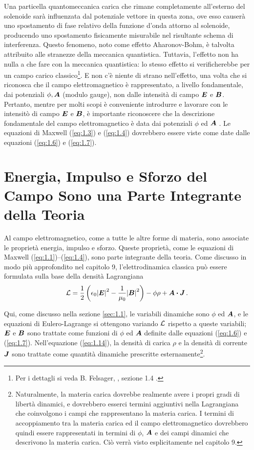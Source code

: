 Una particella quantomeccanica carica che rimane completamente all'esterno del solenoide sarà influenzata dal potenziale vettore in questa zona, ove esso causerà uno spostamento di fase relativo della funzione d'onda attorno al solenoide, producendo uno spostamento fisicamente misurabile nel risultante schema di interferenza. Questo fenomeno, noto come effetto Aharonov-Bohm, è talvolta attribuito alle stranezze della meccanica quantistica. Tuttavia, l'effetto non ha nulla a che fare con la meccanica quantistica: lo stesso effetto si verificherebbe per un campo carico classico\footnote{Per i dettagli si veda B. Felsager, , sezione 1.4 .}. 
E non c'è niente di strano nell'effetto, una volta che si riconosca che il campo elettromagnetico è rappresentato, a livello fondamentale, dai potenziali $\phi, \vb*{A}$ (modulo gauge), non dalle intensità di campo $\vb*{E}$ e $\vb*{B}$. Pertanto, mentre per molti scopi è conveniente introdurre e lavorare con le intensitò di campo $\vb*{E}$ e $\vb*{B}$, è importante riconoscere che la descrizione fondamentale del campo elettromagnetico è data dai potenziali $\phi$ ed $\vb*{A}$ . Le equazioni di Maxwell (\ref{eq:1.3}) e (\ref{eq:1.4}) dovrebbero essere viste come date dalle equazioni (\ref{eq:1.6}) e (\ref{eq:1.7}).


\section[Energia e Impulso del Campo]{Energia, Impulso e Sforzo del Campo Sono una Parte Integrante della Teoria}\label{sec:1.2}
Al campo elettromagnetico, come a tutte le altre forme di materia, sono associate le proprietà energia, impulso e sforzo. Queste proprietà, come le equazioni di Maxwell (\ref{eq:1.1})--(\ref{eq:1.4}), sono parte integrante della teoria. Come discusso in modo più approfondito nel capitolo 9, l'elettrodinamica classica può essere formulata sulla base della densità Lagrangiana  
\begin{equation}\label{eq:1.14}
\cL = \frac{1}{2} \left(\epsilon_0 {\abs{\vb*{E}}}^2 - \frac{1}{\mu_0} {\abs{\vb*{B}}}^2 \right) - \phi \rho + \vb*{A} \vdot \vb*{J}\,.
\end{equation}

Qui, come discusso nella sezione \ref{sec:1.1}, le variabili dinamiche sono $\phi$ ed $\vb*{A}$, e le equazioni di Eulero-Lagrange si ottengono variando $\mathcal{L}$ rispetto a queste variabili; $\vb*{E}$ e $\vb*{B}$ sono trattate come funzioni di $\phi$ ed $\vb*{A}$ definite dalle equazioni (\ref{eq:1.6}) e (\ref{eq:1.7}). Nell'equazione (\ref{eq:1.14}), la densità di carica $\rho$ e la densità di corrente $\vb*{J}$ sono trattate come quantità dinamiche prescritte 
esternamente\footnote{Naturalmente, la materia carica dovrebbe realmente avere i propri gradi di libertà dinamici, e dovrebbero esserci termini aggiuntivi nella Lagrangiana che coinvolgono i campi che rappresentano la materia carica. I termini di accoppiamento tra la materia carica ed il campo elettromagnetico dovrebbero quindi essere rappresentati in termini di $\phi$, $\vb*{A}$ e dei campi dinamici che descrivono la materia carica. Ciò verrà visto esplicitamente nel capitolo 9.}. 

